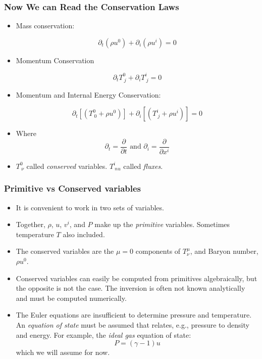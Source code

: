 \documentclass[]{beamer}
\newcommand{\paren}[1]{\left( #1 \right)}
\newcommand{\sqrbrace}[1]{\left[ #1 \right]}
\begin{document}
\begin{frame}
  \frametitle{Now We can Read the Conservation Laws}
  \begin{itemize}
  \item Mass conservation:
    \begin{small}
      \begin{displaymath}
        \partial_t \paren{\rho u^0} + \partial_i\paren{\rho u^i} = 0
      \end{displaymath}
    \end{small}
  \item Momentum Conservation
    \begin{small}
      \begin{displaymath}
        \partial_tT^0_{\ j} + \partial_iT^i_{\ j} = 0
      \end{displaymath}
    \end{small}
  \item Momentum and Internal Energy Conservation:
    \begin{small}
      \begin{displaymath}
        \partial_t\sqrbrace{\paren{T^0_{\ 0} + \rho u^0}}
        + \partial_i\sqrbrace{\paren{T^i_{\ j} + \rho u^i}}
        = 0
      \end{displaymath}
    \end{small}
  \item Where
    $$\partial_t = \frac{\partial}{\partial t}\text{ and }\partial_i = \frac{\partial}{\partial x^i}$$
  \item $T^0_{\ \nu}$ called \textit{conserved} variables. $T^i_{\ nu}$ called \textit{fluxes}.
  \end{itemize}
\end{frame}

\begin{frame}
  \frametitle{Primitive vs Conserved variables}
  \begin{itemize}
  \item It is convenient to work in two sets of variables.
  \item Together, $\rho$, $u$, $v^i$, and $P$ make up the
    \textit{primitive} variables. Sometimes temperature $T$ also
    included.
  \item The conserved variables are the $\mu=0$ components of
    $T^\mu_\nu$, and Baryon number, $\rho u^0$.
  \item Conserved variables can easily be computed from primitives
    algebraically, but the opposite is not the case. The inversion is
    often not known analytically and must be computed numerically.
  \item The Euler equations are insufficient to determine pressure and
    temperature. An \textit{equation of state} must be assumed that
    relates, e.g., pressure to density and energy. For example, the
    \textit{ideal gas} equation of state:
    $$P = (\gamma - 1) u$$
    which we will assume for now.
  \end{itemize}
\end{frame}
\end{document}
